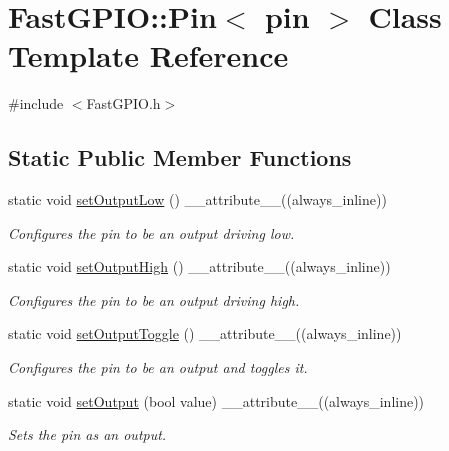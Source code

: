 \hypertarget{class_fast_g_p_i_o_1_1_pin}{}\section{Fast\+G\+P\+IO\+:\+:Pin$<$ pin $>$ Class Template Reference}
\label{class_fast_g_p_i_o_1_1_pin}


{\ttfamily \#include $<$Fast\+G\+P\+I\+O.\+h$>$}

\subsection*{Static Public Member Functions}
\begin{DoxyCompactItemize}
\item 
static void \hyperlink{class_fast_g_p_i_o_1_1_pin_a557f119d37b84f3f521d7cbd4cc27b21}{set\+Output\+Low} () \+\_\+\+\_\+attribute\+\_\+\+\_\+((always\+\_\+inline))
\begin{DoxyCompactList}\small\item\em Configures the pin to be an output driving low. \end{DoxyCompactList}\item 
static void \hyperlink{class_fast_g_p_i_o_1_1_pin_aaa0032dcb76492716f477d60721a0579}{set\+Output\+High} () \+\_\+\+\_\+attribute\+\_\+\+\_\+((always\+\_\+inline))
\begin{DoxyCompactList}\small\item\em Configures the pin to be an output driving high. \end{DoxyCompactList}\item 
\mbox{\label{class_fast_g_p_i_o_1_1_pin_abbdcf0314f4e11543b70ff3a8f63bbb1}} 
static void \hyperlink{class_fast_g_p_i_o_1_1_pin_abbdcf0314f4e11543b70ff3a8f63bbb1}{set\+Output\+Toggle} () \+\_\+\+\_\+attribute\+\_\+\+\_\+((always\+\_\+inline))
\begin{DoxyCompactList}\small\item\em Configures the pin to be an output and toggles it. \end{DoxyCompactList}\item 
static void \hyperlink{class_fast_g_p_i_o_1_1_pin_a87fb88b3ea6343db0e4a06f579a10249}{set\+Output} (bool value) \+\_\+\+\_\+attribute\+\_\+\+\_\+((always\+\_\+inline))
\begin{DoxyCompactList}\small\item\em Sets the pin as an output. \end{DoxyCompactList}\item 

\end{DoxyCompactItemize}
